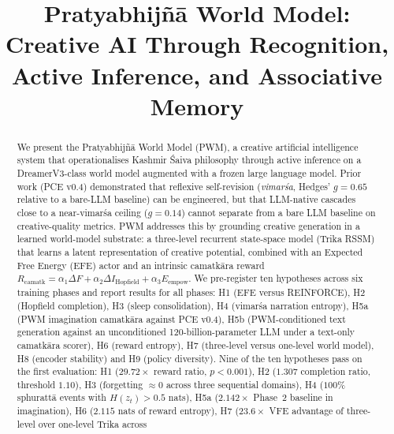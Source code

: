 \documentclass[journal,onecolumn,11pt]{IEEEtran}
\begin{document}
\title{Pratyabhijñā World Model: Creative AI Through Recognition,\\
Active Inference, and Associative Memory}

\author{
}

\maketitle

\begin{abstract}
We present the Pratyabhijñā World Model (PWM), a creative artificial
intelligence system that operationalises Kashmir Śaiva philosophy through
active inference on a DreamerV3-class world model augmented with a frozen
large language model.
Prior work (PCE v0.4) demonstrated that reflexive self-revision
(\emph{vimarśa}, Hedges' $g = 0.65$ relative to a bare-LLM baseline) can be
engineered, but that LLM-native cascades close to a near-vimarśa ceiling
($g = 0.14$) cannot separate from a bare LLM baseline on creative-quality
metrics.
PWM addresses this by grounding creative generation in a learned world-model
substrate: a three-level recurrent state-space model (Trika RSSM) that learns
a latent representation of creative potential, combined with an Expected
Free Energy (EFE) actor and an intrinsic camatkāra reward
$R_{\text{camatk}} = \alpha_1 \Delta F + \alpha_2 \Delta I_{\text{Hopfield}}
+ \alpha_3 E_{\text{empow}}$.
We pre-register ten hypotheses across six training phases and report
results for all phases: H1 (EFE versus REINFORCE), H2 (Hopfield completion),
H3 (sleep consolidation), H4 (vimarśa narration entropy),
H5a (PWM imagination camatkāra against PCE v0.4), H5b (PWM-conditioned
text generation against an unconditioned 120-billion-parameter LLM under a
text-only camatkāra scorer), H6 (reward entropy), H7 (three-level versus
one-level world model), H8 (encoder stability) and H9 (policy diversity).
Nine of the ten hypotheses pass on the first evaluation:
H1 ($29.72\times$ reward ratio, $p < 0.001$),
H2 ($1.307$ completion ratio, threshold $1.10$),
H3 (forgetting $\approx 0$ across three sequential domains),
H4 ($100\%$ sphurattā events with $H(z_t) > 0.5$ nats),
H5a ($2.142\times$ Phase~2 baseline in imagination),
H6 ($2.115$ nats of reward entropy),
H7 ($23.6\times$ VFE advantage of three-level over one-level Trika across

\end{abstract}
\end{document}
